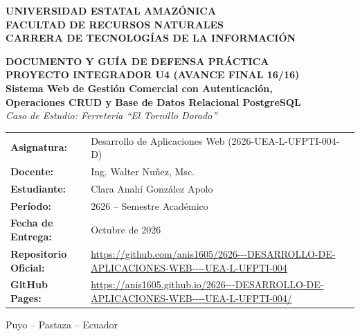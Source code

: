 \documentclass[11pt,a4paper]{article}
\begin{document}
\begin{titlepage}
    \centering
    \vspace*{0.5cm}
    {\large \textbf{UNIVERSIDAD ESTATAL AMAZÓNICA}}\\[0.8ex]
    {\large \textbf{FACULTAD DE RECURSOS NATURALES}}\\[0.8ex]
    {\normalsize \textbf{CARRERA DE TECNOLOGÍAS DE LA INFORMACIÓN}}\\[2.5cm]

    \begin{tcolorbox}[colback=white,colframe=ueanavy,arc=3mm,width=0.95\textwidth,halign=center]
        \vspace{0.3cm}
        {\Large \textbf{\color{ueanavy}DOCUMENTO Y GUÍA DE DEFENSA PRÁCTICA}}\\[1.5ex]
        {\large \textbf{PROYECTO INTEGRADOR U4 (AVANCE FINAL 16/16)}}\\[2ex]
        {\large \textbf{Sistema Web de Gestión Comercial con Autenticación,\\ Operaciones CRUD y Base de Datos Relacional PostgreSQL}}\\[1ex]
        {\textit{Caso de Estudio: Ferretería ``El Tornillo Dorado''}}
        \vspace{0.3cm}
    \end{tcolorbox}

    \vspace{2.5cm}

    \begin{flushleft}
        \begin{tabular}{ll}
            \textbf{Asignatura:} & Desarrollo de Aplicaciones Web (2626-UEA-L-UFPTI-004-D) \\
            \textbf{Docente:} & Ing. Walter Nuñez, Msc. \\
            \textbf{Estudiante:} & Clara Anahí González Apolo \\
            \textbf{Período:} & 2626 -- Semestre Académico \\
            \textbf{Fecha de Entrega:} & Octubre de 2026 \\
            \textbf{Repositorio Oficial:} & \url{https://github.com/anis1605/2626---DESARROLLO-DE-APLICACIONES-WEB----UEA-L-UFPTI-004} \\
            \textbf{GitHub Pages:} & \url{https://anis1605.github.io/2626---DESARROLLO-DE-APLICACIONES-WEB----UEA-L-UFPTI-004/}
        \end{tabular}
    \end{flushleft}

    \vfill
    {\small Puyo -- Pastaza -- Ecuador}
\end{titlepage}
\end{document}
